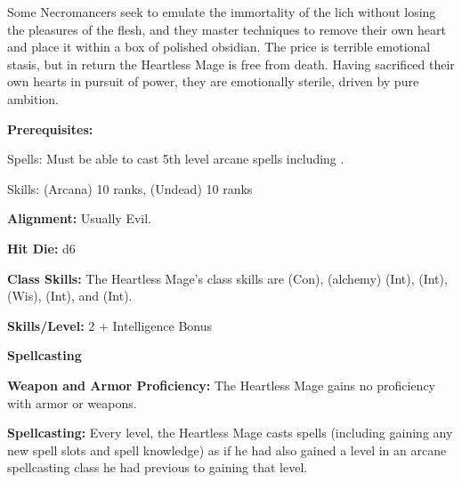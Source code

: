 
Some Necromancers seek to emulate the immortality of the lich without losing the pleasures of the flesh, and they master techniques to remove their own heart and place it within a box of polished obsidian. The price is terrible emotional stasis, but in return the Heartless Mage is free from death. Having sacrificed their own hearts in pursuit of power, they are emotionally sterile, driven by pure ambition.

\textbf{Prerequisites:} 
\begin{description*}
\item[\hspace*{1.5cm}Spells:] Must be able to cast 5th level arcane spells including .
\item[\hspace*{1.5cm}Skills:]  (Arcana) 10 ranks,  (Undead) 10 ranks
\end{description*}

\textbf{Alignment:} Usually Evil.

\textbf{Hit Die:} d6

\textbf{Class Skills:} The Heartless Mage's class skills are  (Con),  (alchemy) (Int),  (Int),  (Wis),  (Int), and  (Int).

\textbf{Skills/Level:} 2 + Intelligence Bonus

\poorbab{}
\goodfor{}
\poorref{}
\goodwil{}

\begin{extraclasstable}{\textbf{Spellcasting}}
\end{extraclasstable}

\classfeatures

\textbf{Weapon and Armor Proficiency:} The Heartless Mage gains no proficiency with armor or weapons.

\textbf{Spellcasting:} Every level, the Heartless Mage casts spells (including gaining any new spell slots and spell knowledge) as if he had also gained a level in an arcane spellcasting class he had previous to gaining that level.

